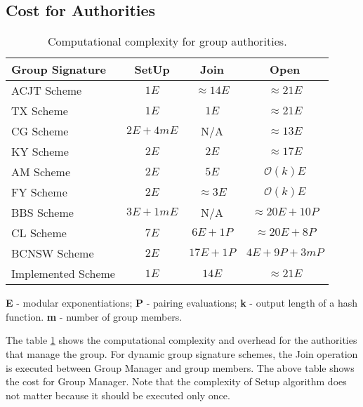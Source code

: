 \subsection{Cost for Authorities}
\begin{table}[!h]
\begin{center}
\begin{threeparttable}
\renewcommand{\arraystretch}{1.3}
\caption{Computational complexity for group authorities.}
\label{table:Computational complexity for group authorities}
\begin{tabular}{| l | c | c | c |}
\hline 
\textbf{Group Signature} & \textbf{SetUp} & \textbf{Join} & \textbf{Open} \\
\hline\hline

ACJT Scheme		  & $1E$ 	  & $\approx 14E$& $\approx 21E$ 		\\ \hline
TX Scheme		  & $1E$	  & $1E$ 		 & $\approx 21E$ 		\\ \hline
CG Scheme  		  & $2E + 4mE$& N/A 		 & $\approx 13E$ 		\\ \hline
KY Scheme  		  & $2E$	  & $2E$		 & $\approx 17E$ 		\\ \hline\hline
AM Scheme  		  & $2E$ 	  & $5E$  		 & $\mathcal{O}(k)E$	\\ \hline
FY Scheme  		  & $2E$ 	  & $\approx 3E$ & $\mathcal{O}(k)E$	\\ \hline\hline
BBS Scheme		  & $3E + 1mE$& N/A 		 & $\approx 20E + 10P$	\\ \hline
CL Scheme		  & $7E$ 	  & $6E + 1P$	 & $\approx 20E + 8P$ 	\\ \hline
BCNSW Scheme	  & $2E$ 	  & $17E+ 1P$ 	 & $4E + 9P + 3mP$ 		\\ \hline\hline
Implemented Scheme& $1E$	  & $14E$ 		 & $\approx 21E$ 		\\ \hline

\end{tabular}
\begin{tablenotes}\footnotesize
\item \textbf{E} - modular exponentiations; \textbf{P} - pairing evaluations; \textbf{k} - output length of a hash function. \textbf{m} - number of group members.
\end{tablenotes}
\end{threeparttable}
\end{center}
\end{table}
The table \ref{table:Computational complexity for group authorities} shows the computational complexity and overhead for the authorities that manage the group. For dynamic group signature schemes, the Join operation is executed between Group Manager and group members. The above table shows the cost for Group Manager. Note that the complexity of Setup algorithm does not matter because it should be executed only once.


